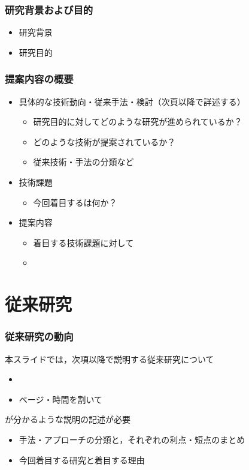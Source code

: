 \documentclass[dvipdfmx,cjk,t,10pt]{beamer}
\begin{document}
\begin{frame}
\frametitle{研究背景および目的}
	\begin{itemize}
	\item 研究背景
	\item 研究目的	
	\end{itemize}			
\end{frame}

\begin{frame}
\frametitle{提案内容の概要}
	\begin{itemize}
	\item  具体的な技術動向・従来手法・検討（次頁以降で詳述する）
		\begin{itemize}
		\item 研究目的に対してどのような研究が進められているか？
		\item どのような技術が提案されているか？
		\item 従来技術・手法の分類など
		\end{itemize}			
	\item 技術課題
		\begin{itemize}
		\item 今回着目するは何か？
		\end{itemize}			
	\item 提案内容
		\begin{itemize}
		\item 着目する技術課題に対して
		\item {}
		\end{itemize}		
	\end{itemize}	
\end{frame}

\section{従来研究}

\begin{frame}
\frametitle{従来研究の動向}

	\begin{screen}
		本スライドでは，次項以降で説明する従来研究について
		\begin{itemize}
			\item {}
			\item ページ・時間を割いて
		\end{itemize}	
		が分かるような説明の記述が必要		
	\end{screen}
	
	
	\begin{itemize}
	\item 手法・アプローチの分類と，それぞれの利点・短点のまとめ
	\item 今回着目する研究と着目する理由
	\end{itemize}	
\end{frame}
\end{document}
